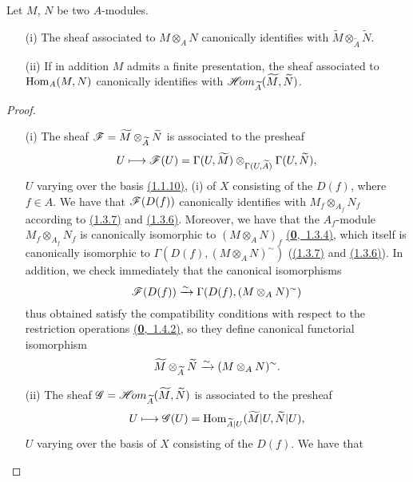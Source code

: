 \begin{cor}[1.3.12]
\label{cor-1.1.3.12}
Let $M$, $N$ be two $A$-modules.
\begin{itemize}
  \item[{\rm(i)}] The sheaf associated to $M\otimes_A N$ canonically identifies with
        $\widetilde{M}\otimes_{\widetilde{A}}\widetilde{N}$.
  \item[{\rm(ii)}] If in addition $M$ admits a finite presentation, the sheaf associated to
        ${\mathop{\mathrm{Hom}}\nolimits}_A(M,N)$ canonically identifies with
        $\mathscr{H}\!{om}_{\widetilde{A}}(\widetilde{M},\widetilde{N})$.
\end{itemize}
\end{cor}

\begin{proof}
\label{proof-cor-1.1.3.12}
\medskip\noindent
\begin{itemize}
  \item[(i)] The sheaf $\mathscr{F}=\widetilde{M}\otimes_{\widetilde{A}}\widetilde{N}$ is associated to
        the presheaf
        \[
          U\longmapsto\mathscr{F}(U)
          =\Gamma(U,\widetilde{M})\otimes_{\Gamma(U,\widetilde{A})}\Gamma(U,\widetilde{N}),
        \]
        $U$ varying over the basis \hyperref[prop-1.1.1.10]{(1.1.10)}, (i) of $X$ consisting of the
        $D(f)$, where $f\in A$. We have that $\mathscr{F}(D(f))$ canonically identifies with
        $M_f\otimes_{A_f}N_f$ according to \hyperref[thm-1.1.3.7]{(1.3.7)} and \hyperref[prop-1.1.3.6]{(1.3.6)}.
        Moreover, we have that the $A_f$-module $M_f\otimes_{A_f}N_f$ is canonically
        isomorphic to $(M\otimes_A N)_f$ \hyperref[env-0.1.3.4]{(\textbf{0},~1.3.4)}, which itself is canonically
        isomorphic to $\Gamma(D(f),(M\otimes_A N)^\sim)$ (\hyperref[thm-1.1.3.7]{(1.3.7)} and
        \hyperref[prop-1.1.3.6]{(1.3.6)}). In addition, we check immediately that the canonical
        isomorphisms
        \[
          \mathscr{F}(D(f))\xrightarrow{\sim}\Gamma(D(f),(M\otimes_A N)^\sim)
        \]
        thus obtained satisfy the compatibility conditions with respect to the restriction
        operations \hyperref[env-0.1.4.2]{(\textbf{0},~1.4.2)}, so they define canonical functorial isomorphism
        \[
          \widetilde{M}\otimes_{\widetilde{A}}\widetilde{N}\xrightarrow{\sim}(M\otimes_A N)^\sim.
        \]
  \item[(ii)] The sheaf $\mathscr{G}=\mathscr{H}\!{om}_{\widetilde{A}}(\widetilde{M},\widetilde{N})$ is associated
        to the presheaf
        \[
          U\longmapsto\mathscr{G}(U)={\mathop{\mathrm{Hom}}\nolimits}_{\widetilde{A}|U}(\widetilde{M}|U,\widetilde{N}|U),
        \]
        $U$ varying over the basis of $X$ consisting of the $D(f)$. We have that

\end{itemize}
\end{proof}
